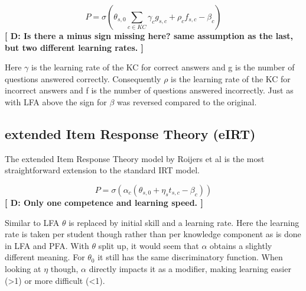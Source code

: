 \documentclass{scrartcl}
\providecommand{\comm}[1]{{\bf[ #1 ]}}
\providecommand{\commd}[1]{\comm{D: {#1}}}
\begin{document}
\begin{equation}
P = \sigma(\theta_{s,0} \sum_{c \in KC}  \gamma_{c} g_{s,c} + \rho_{c} f_{s,c} - \beta_{c})
\end{equation}
\commd{Is there a minus sign missing here? same assumption as the last, but two different learning rates. }

Here $\gamma$ is the learning rate of the KC for correct answers and g is the number of questions answered correctly. Consequently $\rho$ is the learning rate of the KC for incorrect answers and f is the number of questions answered incorrectly. Just as with LFA above the sign for $\beta$ was reversed compared to the original.

\begin{comment}
To compare the PFA parameter values to LFA values, the weighted average (according to the ratio g:f for each problem) of $\gamma$ and $\rho$ should be compared to $\eta$. $\theta$ cannot be compared when comparing PFA on LFA data, vice versa, $\theta$ should be compared to 0. In case of PFA+ $\theta$ values can be compared directly.

\begin{mycapequ}
\begin{equation}
\eta_{c}: \frac{\gamma_{c} g_{c} + \rho_{c} f_{c}}{g_{c}+f_{c}}
\end{equation}
\caption{Comparison of LFA parameters to PFA parameters}
\end{mycapequ}
\end{comment}

\subsection{extended Item Response Theory (eIRT)}
\label{sec:eirt}
The extended Item Response Theory model by Roijers et al \cite{eirt} is the most straightforward extension to the standard IRT model.

\begin{equation}
\label{eq:eirt}
P = \sigma(\alpha_{c} (\theta_{s,0} + \eta_{s} t_{s,c} - \beta_{c}))
\end{equation}
\commd{Only one competence and learning speed.}

Similar to LFA $\theta$ is replaced by initial skill and a learning rate. Here the learning rate is taken per student though rather than per knowledge component as is done in LFA and PFA. With $\theta$ split up, it would seem that $\alpha$ obtains a slightly different meaning. For $\theta_{0}$ it still has the same discriminatory function. When looking at $\eta$ though, $\alpha$ directly impacts it as a modifier, making learning easier (>1) or more difficult (<1).
\end{document}
